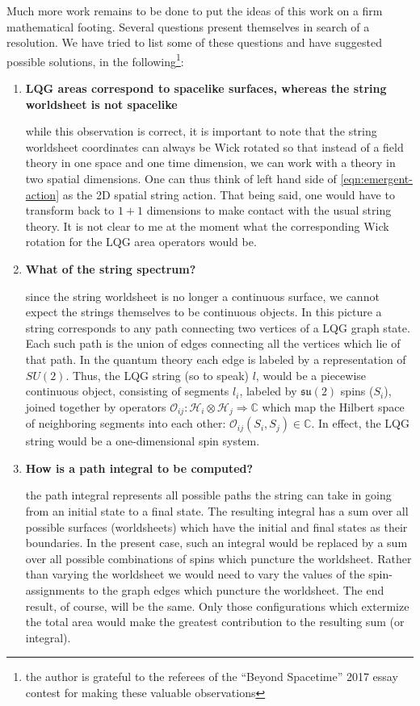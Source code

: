 \documentclass{ws-mpla}
\newcommand{\mc}[1]{\mathcal{#1}}
\newcommand{\mbb}[1]{\mathbb{#1}}
\newcommand{\mf}[1]{\mathfrak{#1}}
\begin{document}
Much more work remains to be done to put the ideas of this work on a firm mathematical footing. Several questions present themselves in search of a resolution. We have tried to list some of these questions and  have suggested possible solutions, in the following\footnote{the author is grateful to the referees of the ``Beyond Spacetime'' 2017 essay contest for making these valuable observations}:
\begin{enumerate}
	\item \textbf{LQG areas correspond to spacelike surfaces, whereas the string worldsheet is not spacelike}
	
	while this observation is correct, it is important to note that the string worldsheet coordinates can always be Wick rotated so that instead of a field theory in one space and one time dimension, we can work with a theory in two spatial dimensions. One can thus think of left hand side of \eqref{eqn:emergent-action} as the 2D spatial string action. That being said, one would have to transform back to $ 1+1 $ dimensions to make contact with the usual string theory. It is not clear to me at the moment what the corresponding Wick rotation for the LQG area operators would be.
	
	\item \textbf{What of the string spectrum?}
	
	since the string worldsheet is no longer a continuous surface, we cannot expect the strings themselves to be continuous objects. In this picture a string corresponds to any path connecting two vertices of a LQG graph state. Each such path is the union of edges connecting all the vertices which lie of that path. In the quantum theory each edge is labeled by a representation of $ SU(2) $. Thus, the LQG string (so to speak) $ l $, would be a piecewise continuous object, consisting of segments $ l_i$, labeled by $ \mf{su}(2) $ spins ($ S_i $), joined together by operators $ \mc{O}_{ij} : \mc{H}_i \otimes \mc{H}_j \Rightarrow \mbb{C} $ which map the Hilbert space of neighboring segments into each other: $ \mc{O}_{ij}(S_i, S_j) \in \mbb{C} $. In effect, the LQG string would be a one-dimensional spin system.
	
	\item \textbf{How is a path integral to be computed?}
	
	the path integral represents all possible paths the string can take in going from an initial state to a final state. The resulting integral has a sum over all possible surfaces (worldsheets) which have the initial and final states as their boundaries. In the present case, such an integral would be replaced by a sum over all possible combinations of spins which puncture the worldsheet. Rather than varying the worldsheet we would need to vary the values of the spin-assignments to the graph edges which puncture the worldsheet. The end result, of course, will be the same. Only those configurations which extermize the total area would make the greatest contribution to the resulting sum (or integral).
	
\end{enumerate}
\end{document}
